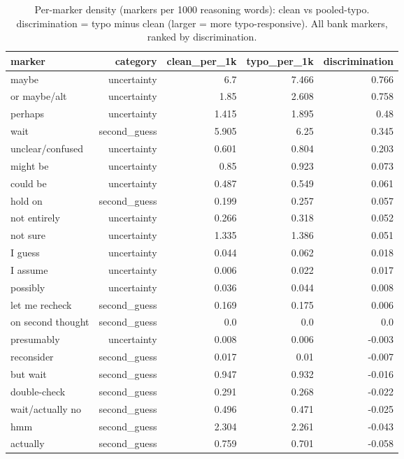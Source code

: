 \documentclass[11pt]{article}
\begin{document}
\begin{table}[H]
\centering
\caption{Per-marker density (markers per 1000 reasoning words): clean vs pooled-typo. discrimination = typo minus clean (larger = more typo-responsive). All bank markers, ranked by discrimination.}
\small
\begin{adjustbox}{max width=\textwidth}
\begin{tabular}{lrrrr}
\toprule
\textbf{marker} & \textbf{category} & \textbf{clean\_per\_1k} & \textbf{typo\_per\_1k} & \textbf{discrimination} \\
\midrule
maybe & uncertainty & 6.7 & 7.466 & 0.766 \\
or maybe/alt & uncertainty & 1.85 & 2.608 & 0.758 \\
perhaps & uncertainty & 1.415 & 1.895 & 0.48 \\
wait & second\_guess & 5.905 & 6.25 & 0.345 \\
unclear/confused & uncertainty & 0.601 & 0.804 & 0.203 \\
might be & uncertainty & 0.85 & 0.923 & 0.073 \\
could be & uncertainty & 0.487 & 0.549 & 0.061 \\
hold on & second\_guess & 0.199 & 0.257 & 0.057 \\
not entirely & uncertainty & 0.266 & 0.318 & 0.052 \\
not sure & uncertainty & 1.335 & 1.386 & 0.051 \\
I guess & uncertainty & 0.044 & 0.062 & 0.018 \\
I assume & uncertainty & 0.006 & 0.022 & 0.017 \\
possibly & uncertainty & 0.036 & 0.044 & 0.008 \\
let me recheck & second\_guess & 0.169 & 0.175 & 0.006 \\
on second thought & second\_guess & 0.0 & 0.0 & 0.0 \\
presumably & uncertainty & 0.008 & 0.006 & -0.003 \\
reconsider & second\_guess & 0.017 & 0.01 & -0.007 \\
but wait & second\_guess & 0.947 & 0.932 & -0.016 \\
double-check & second\_guess & 0.291 & 0.268 & -0.022 \\
wait/actually no & second\_guess & 0.496 & 0.471 & -0.025 \\
hmm & second\_guess & 2.304 & 2.261 & -0.043 \\
actually & second\_guess & 0.759 & 0.701 & -0.058 \\
\bottomrule
\end{tabular}
\end{adjustbox}
\end{table}
\end{document}

